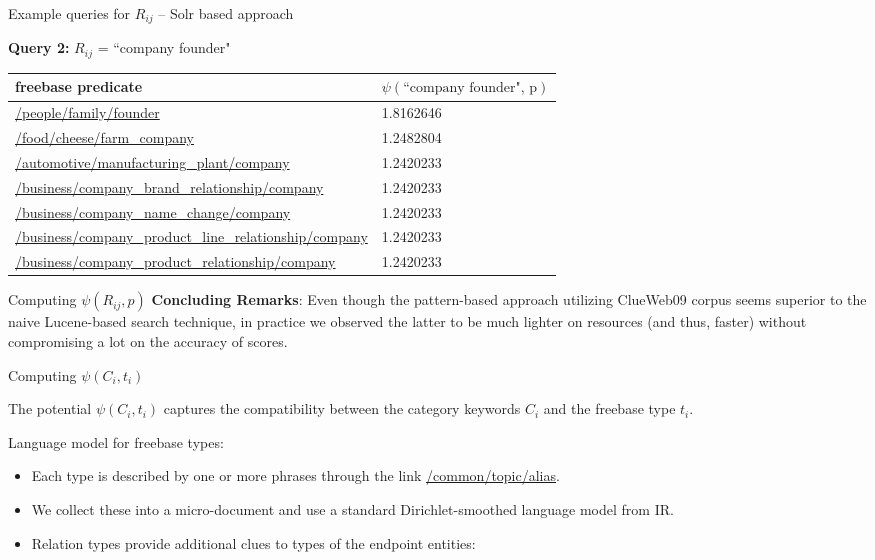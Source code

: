 \documentclass[pdf,11pt]{beamer}
\begin{document}

\begin{frame}{Example queries for $R_{ij}$ -- Solr based approach}

\textbf{Query 2:} $R_{ij}$ = ``company founder"
\begin{longtable}{| p{} | p{} |}
\hline
\textbf{freebase predicate} & $\psi(\text{``company founder", p})$ \\ \hline \hline
\url{/people/family/founder} & 1.8162646 \\ \hline
\url{/food/cheese/farm_company} & 1.2482804 \\ \hline
\url{/automotive/manufacturing_plant/company} & 1.2420233 \\ \hline
\url{/business/company_brand_relationship/company} & 1.2420233 \\ \hline
\url{/business/company_name_change/company} & 1.2420233 \\ \hline
\url{/business/company_product_line_relationship/company} & 1.2420233 \\ \hline
\url{/business/company_product_relationship/company} & 1.2420233 \\ \hline
\end{longtable}

\end{frame}




\begin{frame}{Computing $\psi(R_{ij},p)$}
\textbf{Concluding Remarks}: Even though the pattern-based approach utilizing ClueWeb09 corpus seems superior to the naive Lucene-based search technique, in practice we observed the latter to be much lighter on resources (and thus, faster) without compromising a lot on the accuracy of scores.

\end{frame}

\begin{frame}{Computing $\psi(C_i,t_i)$}
\begin{block}{}
The potential $\psi(C_i,t_i)$ captures the compatibility between the category keywords $C_i$ and the freebase type $t_i$.
\end{block}
Language model for freebase types:
\begin{itemize}
\item Each type is described by one or more phrases through the link \url{/common/topic/alias}.
\item  We collect these into a micro-document and use a standard Dirichlet-smoothed language model from IR.
\item Relation types provide additional clues to types of the endpoint entities:

\end{itemize}


\end{frame}
\end{document}
